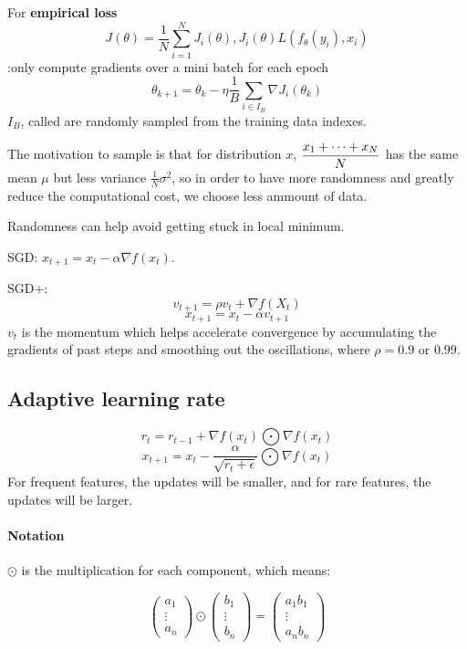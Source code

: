 For \textbf{empirical loss} 
\[J(\theta)=\frac{1}{N}\sum_{i=1}^N J_i(\theta),J_i(\theta)L(f_\theta(y_i),x_i)\]
:only compute gradients over a mini batch for each epoch
\[\theta_{k+1}=\theta_k-\eta\frac{1}{B}\sum_{i\in I_B} \nabla  J_i(\theta_k)\]
$ I_B $, called  are randomly sampled from the training data indexes.

The motivation to sample is that for distribution  $ x $,  $ \displaystyle\frac{x_1+\cdots+x_N}{N} $ has the same mean  $ \mu  $ but less variance  $ \frac{1}{N}\sigma^2 $, so in order to have more randomness and greatly reduce the computational cost, we choose less ammount of data.

Randomness can help avoid getting stuck in  local minimum.

SGD: $ x_{t+1}=x_t-\alpha \nabla f(x_t) $.

SGD+:
\[v_{t+1}=\rho v_t+\nabla f(X_t)\]
\[x_{t+1}=x_t-\alpha v_{t+1}\]
$ v_t $ is the momentum which helps accelerate convergence by accumulating the gradients of past steps and smoothing out the oscillations, where  $ \rho=0.9  $ or  $ 0.99 $.  

\subsection{Adaptive learning rate}

\[r_t=r_{t-1}+\nabla f(x_t)\bigodot  \nabla f(x_t)\]
\[x_{t+1}=x_t-\frac{\alpha}{\sqrt{r_t+\epsilon}}\bigodot  \nabla f(x_t)\]
For frequent features, the  updates will be smaller, and for rare features, the updates will be larger.

\paragraph{Notation}  $ \odot $ is  the multiplication for each component, which means:


\[\begin{pmatrix}
    a_1\\
    \vdots\\
    a_n
\end{pmatrix}\odot\begin{pmatrix}
    b_1\\
    \vdots\\
    b_n
\end{pmatrix}=\begin{pmatrix}
    a_1b_1\\
    \vdots\\
    a_nb_n
\end{pmatrix}\]

